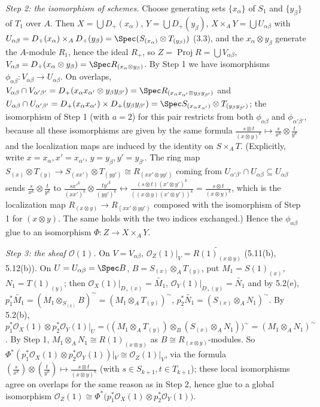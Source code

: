 \documentclass[11pt]{article}
\begin{document}
\emph{Step 2: the isomorphism of schemes.} Choose generating sets $\{x_\alpha\}$ of $S_1$ and $\{y_\beta\}$ of $T_1$ over $A$. Then $X=\bigcup D_+(x_\alpha)$, $Y=\bigcup D_+(y_\beta)$, $X\times_AY=\bigcup U_{\alpha\beta}$ with $U_{\alpha\beta}=D_+(x_\alpha)\times_AD_+(y_\beta)=\Spec(S_{(x_\alpha)}\otimes T_{(y_\beta)})$ (3.3), and the $x_\alpha\otimes y_\beta$ generate the $A$-module $R_1$, hence the ideal $R_+$, so $Z=\operatorname{Proj}R=\bigcup V_{\alpha\beta}$, $V_{\alpha\beta}=D_+(x_\alpha\otimes y_\beta)=\Spec R_{(x_\alpha\otimes y_\beta)}$. By Step 1 we have isomorphisms $\phi_{\alpha\beta}:V_{\alpha\beta}\to U_{\alpha\beta}$. On overlaps, $V_{\alpha\beta}\cap V_{\alpha'\beta'}=D_+(x_\alpha x_{\alpha'}\otimes y_\beta y_{\beta'})=\Spec R_{(x_\alpha x_{\alpha'}\otimes y_\beta y_{\beta'})}$ and $U_{\alpha\beta}\cap U_{\alpha'\beta'}=D_+(x_\alpha x_{\alpha'})\times D_+(y_\beta y_{\beta'})=\Spec S_{(x_\alpha x_{\alpha'})}\otimes T_{(y_\beta y_{\beta'})}$; the isomorphism of Step 1 (with $a=2$) for this pair restricts from both $\phi_{\alpha\beta}$ and $\phi_{\alpha'\beta'}$, because all these isomorphisms are given by the same formula $\frac{s\otimes t}{(x\otimes y)^k}\mapsto\frac s{x^k}\otimes\frac t{y^k}$ and the localization maps are induced by the identity on $S\times_AT$. (Explicitly, write $x=x_\alpha,x'=x_{\alpha'}$, $y=y_\beta,y'=y_{\beta'}$. The ring map $S_{(x)}\otimes T_{(y)}\to S_{(xx')}\otimes T_{(yy')}\cong R_{(xx'\otimes yy')}$ coming from $U_{\alpha'\beta'}\cap U_{\alpha\beta}\subseteq U_{\alpha\beta}$ sends $\frac s{x^k}\otimes\frac t{y^k}$ to $\frac{sx'^k}{(xx')^k}\otimes\frac{ty'^k}{(yy')^k}\leftrightarrow\frac{(s\otimes t)(x'\otimes y')^k}{((x\otimes y)(x'\otimes y'))^k}=\frac{s\otimes t}{(x\otimes y)^k}$, which is the localization map $R_{(x\otimes y)}\to R_{(xx'\otimes yy')}$ composed with the isomorphism of Step 1 for $(x\otimes y)$. The same holds with the two indices exchanged.) Hence the $\phi_{\alpha\beta}$ glue to an isomorphism $\Phi:Z\to X\times_AY$.

\emph{Step 3: the sheaf $\mathcal O(1)$.} On $V=V_{\alpha\beta}$, $\mathcal O_Z(1)|_V=\widetilde{R(1)_{(x\otimes y)}}$ (5.11(b), 5.12(b)). On $U=U_{\alpha\beta}=\Spec B$, $B=S_{(x)}\otimes_AT_{(y)}$, put $M_1=S(1)_{(x)}$, $N_1=T(1)_{(y)}$; then $\mathcal O_X(1)|_{D_+(x)}=\widetilde{M_1}$, $\mathcal O_Y(1)|_{D_+(y)}=\widetilde{N_1}$ and by 5.2(e), $p_1^*\widetilde{M_1}=(M_1\otimes_{S_{(x)}}B)^\sim=(M_1\otimes_AT_{(y)})^\sim$, $p_2^*\widetilde{N_1}=(S_{(x)}\otimes_AN_1)^\sim$. By 5.2(b), $p_1^*\mathcal O_X(1)\otimes p_2^*\mathcal O_Y(1)|_U=\big((M_1\otimes_AT_{(y)})\otimes_B(S_{(x)}\otimes_AN_1)\big)^\sim=(M_1\otimes_AN_1)^\sim$. By Step 1, $M_1\otimes_AN_1\cong R(1)_{(x\otimes y)}$ as $B\cong R_{(x\otimes y)}$-modules. So $\Phi^*(p_1^*\mathcal O_X(1)\otimes p_2^*\mathcal O_Y(1))|_V\cong\mathcal O_Z(1)|_V$, via the formula $(\frac s{x^k})\otimes(\frac t{y^k})\mapsto\frac{s\otimes t}{(x\otimes y)^k}$ (with $s\in S_{k+1},t\in T_{k+1}$); these local isomorphisms agree on overlaps for the same reason as in Step 2, hence glue to a global isomorphism $\mathcal O_Z(1)\cong\Phi^*\big(p_1^*\mathcal O_X(1)\otimes p_2^*\mathcal O_Y(1)\big)$.
\end{document}
